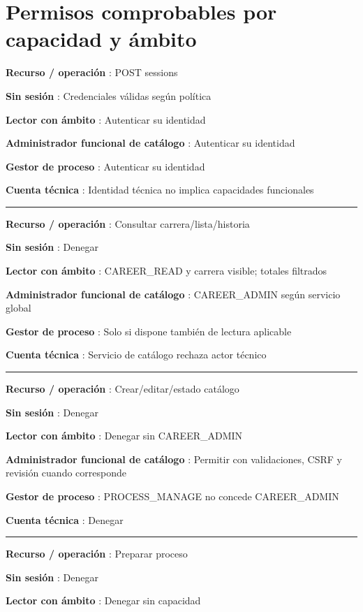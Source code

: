 \documentclass[12pt,a4paper]{report}
\begin{document}
\section{Permisos comprobables por capacidad y
ámbito}\label{AA4-semana-4-anexo0-permisos-comprobables-por-capacidad-y-uxe1mbito}

\textbf{Recurso / operación }: POST sessions

\textbf{Sin sesión }: Credenciales válidas según política

\textbf{Lector con ámbito }: Autenticar su identidad

\textbf{Administrador funcional de catálogo }: Autenticar su identidad

\textbf{Gestor de proceso }: Autenticar su identidad

\textbf{Cuenta técnica }: Identidad técnica no implica capacidades
funcionales

\medskip\hrule\medskip

\textbf{Recurso / operación }: Consultar carrera/lista/historia

\textbf{Sin sesión }: Denegar

\textbf{Lector con ámbito }: CAREER\_READ y carrera visible; totales
filtrados

\textbf{Administrador funcional de catálogo }: CAREER\_ADMIN según
servicio global

\textbf{Gestor de proceso }: Solo si dispone también de lectura
aplicable

\textbf{Cuenta técnica }: Servicio de catálogo rechaza actor técnico

\medskip\hrule\medskip

\textbf{Recurso / operación }: Crear/editar/estado catálogo

\textbf{Sin sesión }: Denegar

\textbf{Lector con ámbito }: Denegar sin CAREER\_ADMIN

\textbf{Administrador funcional de catálogo }: Permitir con
validaciones, CSRF y revisión cuando corresponde

\textbf{Gestor de proceso }: PROCESS\_MANAGE no concede CAREER\_ADMIN

\textbf{Cuenta técnica }: Denegar

\medskip\hrule\medskip

\textbf{Recurso / operación }: Preparar proceso

\textbf{Sin sesión }: Denegar

\textbf{Lector con ámbito }: Denegar sin capacidad
\end{document}
